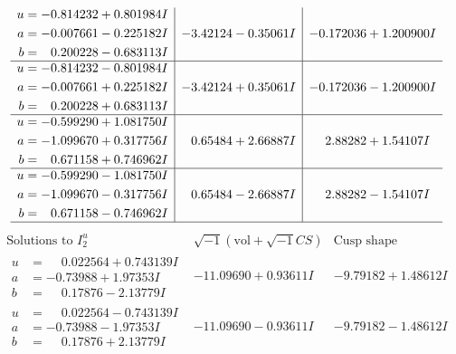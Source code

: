 \documentclass[1p]{elsarticle_modified}
\theoremstyle{definition}
\newcommand{\I}{\sqrt{-1}}
\begin{document}
$$\begin{array}{c|c|c}
\begin{aligned}
u &= -0.814232 + 0.801984 I \\
a &= -0.007661 - 0.225182 I \\
b &= \phantom{-}0.200228 - 0.683113 I\end{aligned}
 & -3.42124 - 0.35061 I & -0.172036 + 1.200900 I \\ \hline\begin{aligned}
u &= -0.814232 - 0.801984 I \\
a &= -0.007661 + 0.225182 I \\
b &= \phantom{-}0.200228 + 0.683113 I\end{aligned}
 & -3.42124 + 0.35061 I & -0.172036 - 1.200900 I \\ \hline\begin{aligned}
u &= -0.599290 + 1.081750 I \\
a &= -1.099670 + 0.317756 I \\
b &= \phantom{-}0.671158 + 0.746962 I\end{aligned}
 & \phantom{-}0.65484 + 2.66887 I & \phantom{-}2.88282 + 1.54107 I \\ \hline\begin{aligned}
u &= -0.599290 - 1.081750 I \\
a &= -1.099670 - 0.317756 I \\
b &= \phantom{-}0.671158 - 0.746962 I\end{aligned}
 & \phantom{-}0.65484 - 2.66887 I & \phantom{-}2.88282 - 1.54107 I\\
 \hline 
 \end{array}$$\newpage$$\begin{array}{c|c|c}  
\text{Solutions to }I^u_{2}& \I (\text{vol} + \sqrt{-1}CS) & \text{Cusp shape}\\
 \hline 
\begin{aligned}
u &= \phantom{-}0.022564 + 0.743139 I \\
a &= -0.73988 + 1.97353 I \\
b &= \phantom{-}0.17876 - 2.13779 I\end{aligned}
 & -11.09690 + 0.93611 I & -9.79182 + 1.48612 I \\ \hline\begin{aligned}
u &= \phantom{-}0.022564 - 0.743139 I \\
a &= -0.73988 - 1.97353 I \\
b &= \phantom{-}0.17876 + 2.13779 I\end{aligned}
 & -11.09690 - 0.93611 I & -9.79182 - 1.48612 I \\ \hline\begin{aligned}

\end{aligned}
\end{array}$$
\end{document}
